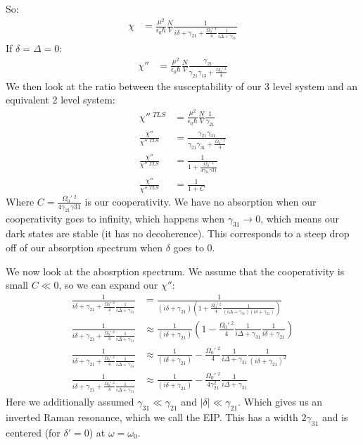 So:
\begin{align*}
	\chi &= \frac{\mu^2}{\epsilon_0\hbar} \frac{N}{V} \frac{1}{i\delta + \gamma_{21} + \frac{\Omega_0'\ ^2}{4}\frac{1}{i\Delta + \gamma_{31}}}
\end{align*}
If $\delta = \Delta = 0$:
\begin{align*}
	\chi'' &= \frac{\mu^2}{\epsilon_0 \hbar} \frac{N}{V} \frac{\gamma_{21}}{\gamma_{21}\gamma_{13} + \frac{\Omega_0'\ ^2}{4}}
\end{align*}
We then look at the ratio between the susceptability of our 3 level system and an equivalent 2 level system:
\begin{align*}
	\chi''\ ^{TLS} &= \frac{\mu^2}{\epsilon_0\hbar} \frac{N}{V} \frac{1}{\gamma_{21}} \\
	\frac{\chi''}{\chi''\ ^{TLS}} &= \frac{\gamma_{21}\gamma_{31}}{\gamma_{21}\gamma_{31} + \frac{\Omega_0'\ ^2}{4}} \\
	\frac{\chi''}{\chi''\ ^{TLS}} &= \frac{1}{1 + \frac{\Omega_0'\ ^2}{4\gamma_{21}\gamma{31}}} \\
	\frac{\chi''}{\chi''\ ^{TLS}} &= \frac{1}{1 + C}
\end{align*}
Where $C = \frac{\Omega_0'\ ^2}{4\gamma_{21}\gamma{31}}$ is our cooperativity. We have no absorption when our cooperativity goes to infinity, which happens when $\gamma_{31}\to0$, which means our dark states are stable (it has no decoherence).
This corresponds to a steep drop off of our absorption spectrum when $\delta$ goes to $0$.

We now look at the abosrption spectrum. We assume that the cooperativity is small $C\ll 0$, so we can expand our $\chi''$:
\begin{align*}
	\frac{1}{i\delta + \gamma_{21} + \frac{\Omega_0'\ ^2}{4}\frac{1}{i\Delta + \gamma_{31}}} &= \frac{1}{(i\delta + \gamma_{21}) \left( 1+ \frac{\Omega_0'\ ^2}{4}\frac{1}{(i\Delta + \gamma_{31})(i\delta + \gamma_{21})}\right)} \\
	\frac{1}{i\delta + \gamma_{21} + \frac{\Omega_0'\ ^2}{4}\frac{1}{i\Delta + \gamma_{31}}} &\approx \frac{1}{(i\delta + \gamma_{21})}\left( 1 - \frac{\Omega_0'\ ^2}{4} \frac{1}{i\Delta + \gamma_{31}} \frac{1}{i\delta + \gamma_{21}}\right)\\
	\frac{1}{i\delta + \gamma_{21} + \frac{\Omega_0'\ ^2}{4}\frac{1}{i\Delta + \gamma_{31}}} &\approx \frac{1}{(i\delta + \gamma_{21})}- \frac{\Omega_0'\ ^2}{4} \frac{1}{i\Delta + \gamma_{31}} \frac{1}{(i\delta + \gamma_{21})^2} \\
	\frac{1}{i\delta + \gamma_{21} + \frac{\Omega_0'\ ^2}{4}\frac{1}{i\Delta + \gamma_{31}}} &\approx \frac{1}{(i\delta + \gamma_{21})}- \frac{\Omega_0'\ ^2}{4\gamma_{21}^2} \frac{1}{i\Delta + \gamma_{31}}
\end{align*}
Here we additionally assumed $\gamma_{31} \ll \gamma_{21}$ and $|\delta|\ll \gamma_{21}$.
Which gives us an inverted Raman resonance, which we call the EIP. This has a width $2\gamma_{31}$ and is centered (for $\delta'=0$) at $\omega = \omega_0$.

